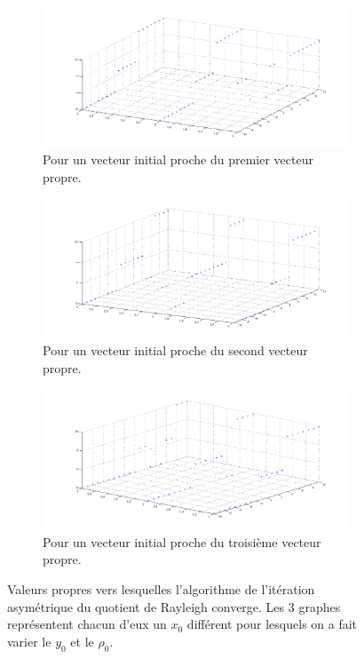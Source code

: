 \begin{figure}
  \centering
  \begin{subfigure}[b]{0.85\textwidth}
    \includegraphics[width=\textwidth]{RayAsym1.png}
    \caption{Pour un vecteur initial proche du premier vecteur propre.}
    \label{fig:a4}
  \end{subfigure}%
  
  \begin{subfigure}[b]{0.85\textwidth}
    \includegraphics[width=\textwidth]{RayAsym2.png}
    \caption{Pour un vecteur initial proche du second vecteur propre.}
    \label{fig:a45}
  \end{subfigure}%
  
  \begin{subfigure}[b]{0.85\textwidth}
    \includegraphics[width=\textwidth]{RayAsym3.png}
    \caption{Pour un vecteur initial proche du troisième vecteur propre.}
    \label{fig:a5}
  \end{subfigure}
  \caption{Valeurs propres vers lesquelles l'algorithme de l'itération asymétrique du quotient de Rayleigh converge. Les 3 graphes représentent chacun d'eux un $x_0$ différent pour lesquels on a fait varier le $y_0$ et le $\rho_0$.}\label{fig:adiff}
\end{figure}	
